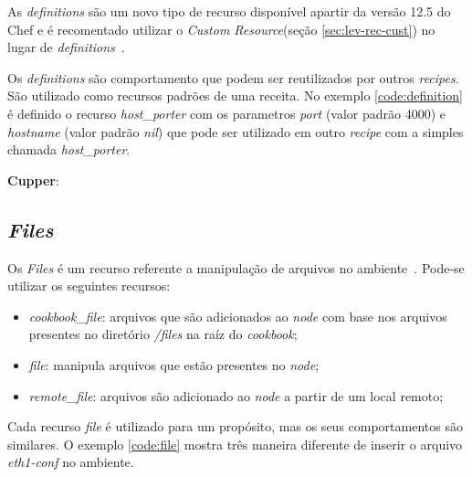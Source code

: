 As \textit{definitions} são um novo tipo de recurso disponível apartir da versão
12.5 do Chef e é recomentado utilizar o \textit{Custom Resource}(seção \ref{sec:lev-rec-cust})
no lugar de \textit{definitions}~\cite{chefdoc:2016}.

Os \textit{definitions} são comportamento que podem ser reutilizados por outros \textit{recipes}.
São utilizado como recursos padrões de uma receita. No exemplo \ref{code:definition}
é definido o recurso \textit{host\_porter} com os parametros \textit{port} (valor padrão 4000)
e \textit{hostname} (valor padrão \textit{nil}) que pode ser utilizado em outro
\textit{recipe} com a simples chamada \textit{host\_porter}.

\begin{minipage}{.90\textwidth}
  \lstset{style=shell}
  
\end{minipage}

\textbf{Cupper}:

\subsection{\textit{Files}}

Os \textit{Files} é um recurso referente a manipulação de arquivos no ambiente~\cite{chefdoc:2016}.
Pode-se utilizar os seguintes recursos:

\begin{itemize}
  \item \textit{cookbook\_file}: arquivos que são adicionados ao \textit{node} com base
    nos arquivos presentes no diretório \textit{/files} na raíz do \textit{cookbook};
  \item \textit{file}: manipula arquivos que estão presentes no \textit{node};
  \item \textit{remote\_file}: arquivos são adicionado ao \textit{node} a partir de um
    local remoto;
\end{itemize}

Cada recurso \textit{file} é utilizado para um propósito, mas os seus comportamentos
são similares. O exemplo \ref{code:file} mostra três maneira diferente de
inserir o arquivo \textit{eth1-conf} no ambiente.

\begin{minipage}{.90\textwidth}
  \lstset{style=shell}
  
\end{minipage}

